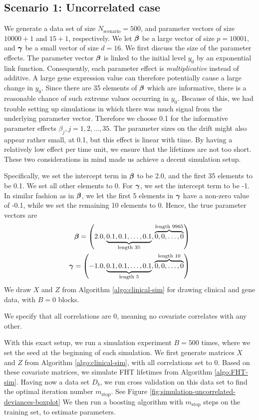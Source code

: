 \subsection{Scenario 1: Uncorrelated case}
We generate a data set of size $N_{\text{scenario}}=500$, and parameter vectors of size $10000+1$ and $15+1$, respectively.
We let $\boldsymbol{\beta}$ be a large vector of size $p=10001$, and $\boldsymbol{\gamma}$ be a small vector of size $d=16$.
We first discuss the size of the parameter effects.
The parameter vector $\boldsymbol{\beta}$ is linked to the initial level $y_0$ by an exponential link function.
Consequently, each parameter effect is \textit{multiplicative} instead of additive.
A large gene expression value can therefore potentially cause a large change in $y_0$.
Since there are 35 elements of $\boldsymbol{\beta}$ which are informative, there is a reasonable chance of such extreme values occurring in $y_0$.
Because of this, we had trouble setting up simulations in which there was much signal from the underlying parameter vector.
Therefore we choose 0.1 for the informative parameter effects $\beta_j,j=1,2,\ldots,35$.
The parameter sizes on the drift might also appear rather small, at 0.1, but this effect is linear with time.
By having a relatively low effect per time unit, we ensure that the lifetimes are not too short.
These two considerations in mind made us achieve a decent simulation setup.

Specifically, we set the intercept term in $\boldsymbol{\beta}$ to be 2.0, and the first 35 elements to be 0.1.
We set all other elements to 0.
For $\boldsymbol{\gamma}$, we set the intercept term to be -1.
In similar fashion as in $\boldsymbol{\beta}$, we let the first 5 elements in $\boldsymbol{\gamma}$ have a non-zero value of -0.1, while we set the remaining 10 elements to 0.
Hence, the true parameter vectors are
\begin{align*}
    \boldsymbol{\beta}=\left(2.0, \underbrace{0.1, 0.1, \ldots, 0.1}_{\text{length 35}}, \overbrace{0, 0, \ldots, 0}^{\text{length 9965}}\right) \\
    \boldsymbol{\gamma}=\left(-1.0, \underbrace{0.1, 0.1, \ldots, 0.1}_{\text{length 5}}, \overbrace{0, 0, \ldots, 0}^{\text{length 10}}\right)
\end{align*}
We draw $X$ and $Z$ from Algorithm \ref{algo:clinical-sim} for drawing clinical and gene data, with $B=0$ blocks.

We specify that all correlations are 0, meaning no covariate correlates with any other.

With this exact setup, we run a simulation experiment $B=500$ times, where we set the seed at the beginning of each simulation.
We first generate matrices $X$ and $Z$ from Algorithm \ref{algo:clinical-sim}, with all correlations set to 0.
Based on these covariate matrices, we simulate FHT lifetimes from Algorithm \ref{algo:FHT-sim}.
Having now a data set $D_b$, we run cross validation on this data set to find the optimal iteration number $m_{\text{stop}}$.
See Figure \ref{fig:simulation-uncorrelated-deviances-boxplot}
We then run a boosting algorithm with $m_{\text{stop}}$ steps on the training set, to estimate parameters.

